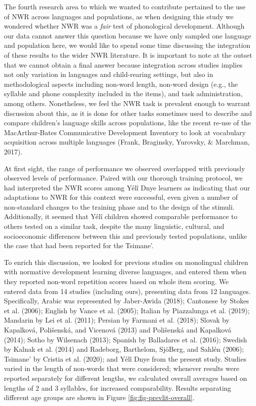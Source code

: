 \documentclass[english,,man,floatsintext]{apa6}
\begin{document}
The fourth research area to which we wanted to contribute pertained to the use of NWR across languages and populations, as when designing this study we wondered whether NWR was a \emph{fair} test of phonological development. Although our data cannot answer this question because we have only sampled one language and population here, we would like to spend some time discussing the integration of these results to the wider NWR literature. It is important to note at the outset that we cannot obtain a final answer because integration across studies implies not only variation in languages and child-rearing settings, but also in methodological aspects including non-word length, non-word design (e.g., the syllable and phone complexity included in the items), and task administration, among others. Nonetheless, we feel the NWR task is prevalent enough to warrant discussion about this, as it is done for other tasks sometimes used to describe and compare children's language skills across populations, like the recent re-use of the MacArthur-Bates Communicative Development Inventory to look at vocabulary acquisition across multiple languages (Frank, Braginsky, Yurovsky, \& Marchman, 2017).

At first sight, the range of performance we observed overlapped with previously observed levels of performance. Paired with our thorough training protocol, we had interpreted the NWR scores among Yélî Dnye learners as indicating that our adaptations to NWR for this context were successful, even given a number of non-standard changes to the training phase and to the design of the stimuli. Additionally, it seemed that Yélî children showed comparable performance to others tested on a similar task, despite the many linguistic, cultural, and socioeconomic differences between this and previously tested populations, unlike the case that had been reported for the Tsimane'.

To enrich this discussion, we looked for previous studies on monolingual children with normative development learning diverse languages, and entered them when they reported non-word repetition scores based on whole item scoring. We entered data from 14 studies (including ours), presenting data from 12 languages. Specifically, Arabic was represented by Jaber-Awida (2018); Cantonese by Stokes et al. (2006); English by Vance et al. (2005); Italian by Piazzalunga et al. (2019); Mandarin by Lei et al. (2011); Persian by Farmani et al. (2018); Slovak by Kapalková, Polišenská, and Vicenová (2013) and Polišenská and Kapalková (2014); Sotho by Wilsenach (2013); Spanish by Balladares et al. (2016); Swedish by Kalnak et al. (2014) and Radeborg, Barthelom, SjöBerg, and Sahlén (2006); Tsimane' by Cristia et al. (2020); and Yélî Dnye from the present study. Studies varied in the length of non-words that were considered; whenever results were reported separately for different lengths, we calculated overall averages based on lengths of 2 and 3 syllables, for increased comparability. Results separating different age groups are shown in Figure \ref{fig:fig-prevlit-overall}.
\end{document}
